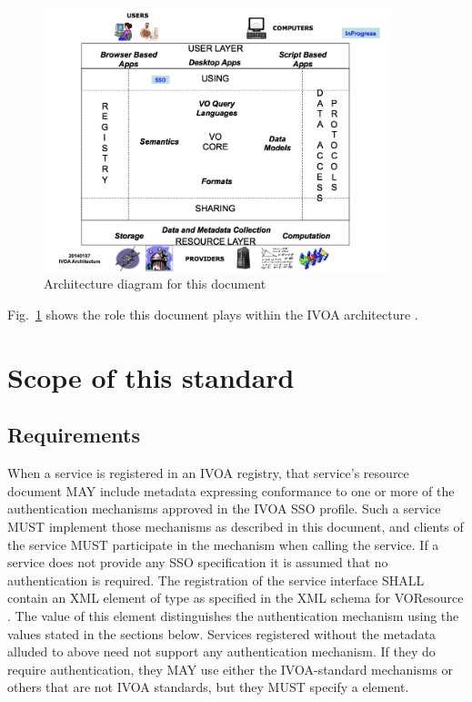 \documentclass[11pt,a4paper]{ivoa}
\begin{document}
\begin{figure}
\centering

\includegraphics[width=0.9\textwidth]{SSO_image001.png}
\caption{Architecture diagram for this document}
\label{fig:archdiag}
\end{figure}

Fig.~\ref{fig:archdiag} shows the role this document plays within the
IVOA architecture \citep{note:VOARCH}.


\section{Scope of this standard}
\subsection{Requirements}
When a service is registered in an IVOA registry, that service's resource document MAY include metadata expressing conformance to one or more of the authentication mechanisms approved in the IVOA SSO profile. Such a service MUST implement those mechanisms as described in this document, and clients of the service MUST participate in the mechanism when calling the service. If a service does not provide any SSO specification it is assumed that no authentication is required.
The registration of the service interface SHALL contain an XML element
of type  as specified in the XML schema for
VOResource \citep{std:VOR}. The value of this element distinguishes the
authentication mechanism using the values stated in the sections below.
Services registered without the metadata alluded to above need not
support any authentication mechanism. If they do require authentication,
they MAY use either the IVOA-standard mechanisms or others that are not
IVOA standards, but they MUST specify a   element.
\end{document}
